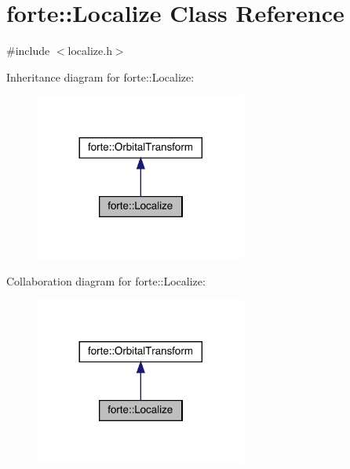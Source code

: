 \hypertarget{classforte_1_1_localize}{}\section{forte\+:\+:Localize Class Reference}
\label{classforte_1_1_localize}


{\ttfamily \#include $<$localize.\+h$>$}



Inheritance diagram for forte\+:\+:Localize\+:
\nopagebreak
\begin{figure}[H]
\begin{center}
\leavevmode
\includegraphics[width=197pt]{classforte_1_1_localize__inherit__graph}
\end{center}
\end{figure}


Collaboration diagram for forte\+:\+:Localize\+:
\nopagebreak
\begin{figure}[H]
\begin{center}
\leavevmode
\includegraphics[width=197pt]{classforte_1_1_localize__coll__graph}
\end{center}
\end{figure}
